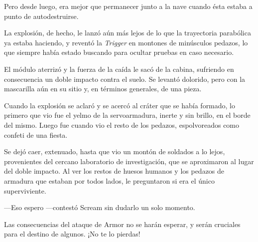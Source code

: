 Pero desde luego, era mejor que permanecer junto a la nave cuando ésta estaba a punto de autodestruirse.

La explosión, de hecho, le lanzó aún más lejos de lo que la trayectoria parabólica ya estaba haciendo, y reventó la \emph{Trigger} en montones de minúsculos pedazos, lo que siempre había estado buscando para ocultar pruebas en caso necesario.

El módulo aterrizó y la fuerza de la caída le sacó de la cabina, sufriendo en consecuencia un doble impacto contra el suelo. Se levantó dolorido, pero con la mascarilla aún en su sitio y, en términos generales, de una pieza.

Cuando la explosión se aclaró y se acercó al cráter que se había formado, lo primero que vio fue el yelmo de la servoarmadura, inerte y sin brillo, en el borde del mismo. Luego fue cuando vio el resto de los pedazos, espolvoreados como confeti de una fiesta.

Se dejó caer, extenuado, hasta que vio un montón de soldados a lo lejos, provenientes del cercano laboratorio de investigación, que se aproximaron al lugar del doble impacto. Al ver los restos de huesos humanos y los pedazos de armadura que estaban por todos lados, le preguntaron si era el único superviviente.

---Eso espero ---contestó Scream sin dudarlo un solo momento.

\begin{next}
    Las consecuencias del ataque de Armor no se harán esperar, y serán cruciales para el destino de algunos. ¡No te lo pierdas!
\end{next}

\endinput
